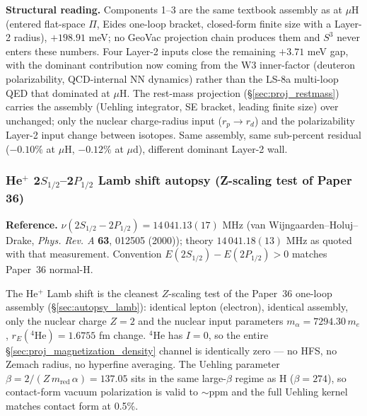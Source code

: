 \documentclass[11pt]{article}
\begin{document}
\textbf{Structural reading.}  Components 1--3 are the same textbook
assembly as at $\mu$H (entered flat-space $\Pi$, Eides one-loop
bracket, closed-form finite size with a Layer-2 radius), $+198.91$ meV; no
GeoVac projection chain produces them and $S^3$ never enters these
numbers.  Four Layer-2
inputs close the remaining $+3.71$ meV gap, with the dominant
contribution now coming from the W3 inner-factor (deuteron
polarizability, QCD-internal NN dynamics) rather than the LS-8a
multi-loop QED that dominated at $\mu$H.  The rest-mass projection
(\S\ref{sec:proj_restmass}) carries the assembly (Uehling
integrator, SE bracket, leading finite size) over unchanged; only the nuclear
charge-radius input ($r_p \to r_d$) and the polarizability
Layer-2 input change between isotopes.  Same assembly, same
sub-percent residual ($-0.10\%$ at $\mu$H, $-0.12\%$ at $\mu$d),
different dominant Layer-2 wall.

\subsubsection{He$^+$ 2$S_{1/2}$--2$P_{1/2}$ Lamb shift autopsy (Z-scaling test of Paper 36)}
\label{sec:autopsy_he_plus_lamb}

\textbf{Reference.}  $\nu(2S_{1/2} - 2P_{1/2}) = 14\,041.13(17)$ MHz
(van Wijngaarden--Holuj--Drake, \emph{Phys. Rev. A} \textbf{63}, 012505
(2000)); theory $14\,041.18(13)$ MHz as quoted with that measurement.
Convention $E(2S_{1/2}) - E(2P_{1/2}) > 0$ matches Paper~36 normal-H.

The He$^+$ Lamb shift is the cleanest $Z$-scaling test of the Paper~36
one-loop assembly (\S\ref{sec:autopsy_lamb}): identical lepton
(electron), identical assembly, only the nuclear charge $Z=2$
and the nuclear input parameters $m_\alpha = 7294.30\,m_e$, $r_E({}^4\text{He})
= 1.6755$ fm change.  ${}^4$He has $I=0$, so the entire
\S\ref{sec:proj_magnetization_density} channel is identically zero ---
no HFS, no Zemach radius, no hyperfine averaging.  The Uehling parameter
$\beta = 2/(Z\,m_{\text{red}}\,\alpha) = 137.05$ sits in the same large-$\beta$
regime as H ($\beta = 274$), so contact-form vacuum polarization is valid
to $\sim$ppm and the full Uehling kernel matches contact form at 0.5\%.
\end{document}

